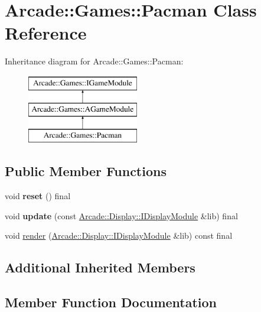 \hypertarget{classArcade_1_1Games_1_1Pacman}{}\section{Arcade\+::Games\+::Pacman Class Reference}
\label{classArcade_1_1Games_1_1Pacman}
Inheritance diagram for Arcade\+::Games\+::Pacman\+:\begin{figure}[H]
\begin{center}
\leavevmode
\includegraphics[height=3.000000cm]{classArcade_1_1Games_1_1Pacman}
\end{center}
\end{figure}
\subsection*{Public Member Functions}
\begin{DoxyCompactItemize}
\item 
\mbox{\label{classArcade_1_1Games_1_1Pacman_ab22a7f3125e07169dc326eb3b89dba94}} 
void {\bfseries reset} () final
\item 
\mbox{\label{classArcade_1_1Games_1_1Pacman_aa6bc227c3f14cc8d66d11f2d32bed3ec}} 
void {\bfseries update} (const \mbox{\hyperlink{classArcade_1_1Display_1_1IDisplayModule}{Arcade\+::\+Display\+::\+I\+Display\+Module}} \&lib) final
\item 
void \mbox{\hyperlink{classArcade_1_1Games_1_1Pacman_ab1a7408f265efbef12b4f9d1a6fb4512}{render}} (\mbox{\hyperlink{classArcade_1_1Display_1_1IDisplayModule}{Arcade\+::\+Display\+::\+I\+Display\+Module}} \&lib) const final
\end{DoxyCompactItemize}
\subsection*{Additional Inherited Members}


\subsection{Member Function Documentation}
\mbox{\label{classArcade_1_1Games_1_1Pacman_ab1a7408f265efbef12b4f9d1a6fb4512}} 
